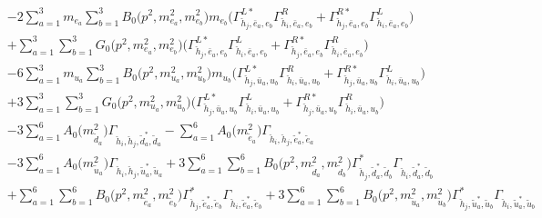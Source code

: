 \begin{itemize}
\begin{align}
 &-2 \sum_{a=1}^{3}m_{e_{{a}}} \sum_{b=1}^{3}{B_0\Big(p^{2},m^2_{e_{{a}}},m^2_{e_{{b}}}\Big)} m_{e_{{b}}} \Big({\Gamma^{L*}_{\check{h}_{{j}},\bar{e}_{{a}},e_{{b}}}} {\Gamma^R_{\check{h}_{{i}},\bar{e}_{{a}},e_{{b}}}}  + {\Gamma^{R*}_{\check{h}_{{j}},\bar{e}_{{a}},e_{{b}}}} {\Gamma^L_{\check{h}_{{i}},\bar{e}_{{a}},e_{{b}}}} \Big)  \nonumber \\ 
 &+\sum_{a=1}^{3}\sum_{b=1}^{3}{G_0\Big(p^{2},m^2_{e_{{a}}},m^2_{e_{{b}}}\Big)} \Big({\Gamma^{L*}_{\check{h}_{{j}},\bar{e}_{{a}},e_{{b}}}} {\Gamma^L_{\check{h}_{{i}},\bar{e}_{{a}},e_{{b}}}}  + {\Gamma^{R*}_{\check{h}_{{j}},\bar{e}_{{a}},e_{{b}}}} {\Gamma^R_{\check{h}_{{i}},\bar{e}_{{a}},e_{{b}}}} \Big)\nonumber \\ 
 &-6 \sum_{a=1}^{3}m_{u_{{a}}} \sum_{b=1}^{3}{B_0\Big(p^{2},m^2_{u_{{a}}},m^2_{u_{{b}}}\Big)} m_{u_{{b}}} \Big({\Gamma^{L*}_{\check{h}_{{j}},\bar{u}_{{a}},u_{{b}}}} {\Gamma^R_{\check{h}_{{i}},\bar{u}_{{a}},u_{{b}}}}  + {\Gamma^{R*}_{\check{h}_{{j}},\bar{u}_{{a}},u_{{b}}}} {\Gamma^L_{\check{h}_{{i}},\bar{u}_{{a}},u_{{b}}}} \Big)  \nonumber \\ 
 &+3 \sum_{a=1}^{3}\sum_{b=1}^{3}{G_0\Big(p^{2},m^2_{u_{{a}}},m^2_{u_{{b}}}\Big)} \Big({\Gamma^{L*}_{\check{h}_{{j}},\bar{u}_{{a}},u_{{b}}}} {\Gamma^L_{\check{h}_{{i}},\bar{u}_{{a}},u_{{b}}}}  + {\Gamma^{R*}_{\check{h}_{{j}},\bar{u}_{{a}},u_{{b}}}} {\Gamma^R_{\check{h}_{{i}},\bar{u}_{{a}},u_{{b}}}} \Big) \nonumber \\ 
 &-3 \sum_{a=1}^{6}{A_0\Big(m^2_{\tilde{d}_{{a}}}\Big)} {\Gamma_{\check{h}_{{i}},\check{h}_{{j}},\tilde{d}^*_{{a}},\tilde{d}_{{a}}}}  - \sum_{a=1}^{6}{A_0\Big(m^2_{\tilde{e}_{{a}}}\Big)} {\Gamma_{\check{h}_{{i}},\check{h}_{{j}},\tilde{e}^*_{{a}},\tilde{e}_{{a}}}}  \nonumber \\ 
 &-3 \sum_{a=1}^{6}{A_0\Big(m^2_{\tilde{u}_{{a}}}\Big)} {\Gamma_{\check{h}_{{i}},\check{h}_{{j}},\tilde{u}^*_{{a}},\tilde{u}_{{a}}}}  +3 \sum_{a=1}^{6}\sum_{b=1}^{6}{B_0\Big(p^{2},m^2_{\tilde{d}_{{a}}},m^2_{\tilde{d}_{{b}}}\Big)} {\Gamma^*_{\check{h}_{{j}},\tilde{d}^*_{{a}},\tilde{d}_{{b}}}} {\Gamma_{\check{h}_{{i}},\tilde{d}^*_{{a}},\tilde{d}_{{b}}}}  \nonumber \\ 
 &+\sum_{a=1}^{6}\sum_{b=1}^{6}{B_0\Big(p^{2},m^2_{\tilde{e}_{{a}}},m^2_{\tilde{e}_{{b}}}\Big)} {\Gamma^*_{\check{h}_{{j}},\tilde{e}^*_{{a}},\tilde{e}_{{b}}}} {\Gamma_{\check{h}_{{i}},\tilde{e}^*_{{a}},\tilde{e}_{{b}}}} +3 \sum_{a=1}^{6}\sum_{b=1}^{6}{B_0\Big(p^{2},m^2_{\tilde{u}_{{a}}},m^2_{\tilde{u}_{{b}}}\Big)} {\Gamma^*_{\check{h}_{{j}},\tilde{u}^*_{{a}},\tilde{u}_{{b}}}} {\Gamma_{\check{h}_{{i}},\tilde{u}^*_{{a}},\tilde{u}_{{b}}}}  \nonumber \\ 

\end{align}
\end{itemize}
